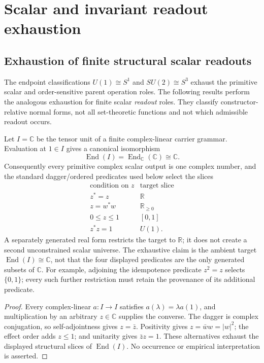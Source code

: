 \documentclass[12pt,a4paper]{article}
\begin{document}
\section{Scalar and invariant readout exhaustion}
\label{paper2a:sec:organized-readouts}

\subsection{Exhaustion of finite structural scalar readouts}
\label{p2:sec:finite-structural-readout-exhaustion}

The endpoint classifications \(U(1)\cong S^1\) and
\(SU(2)\cong S^3\) exhaust the primitive scalar and order-sensitive parent
operation roles.  The following results perform the analogous exhaustion for
finite scalar \emph{readout} roles.  They classify constructor-relative normal
forms, not all set-theoretic functions and not which admissible readout occurs.

\begin{theorem}
\label{p2:thm:scalar-target-exhaustion}
Let \(I=\mathbb C\) be the tensor unit of a finite complex-linear carrier
grammar.  Evaluation at \(1\in I\) gives a canonical isomorphism
\[
 \operatorname{End}(I)
 =\operatorname{End}_{\mathbb C}(\mathbb C)
 \cong\mathbb C.
\]
Consequently every primitive complex scalar output is one complex number, and
the standard dagger/ordered predicates used below select the slices
\[
\begin{array}{c|c}
 \text{condition on }z&\text{target slice}\\ \hline
 z^*=z&\mathbb R\\
 z=w^*w&\mathbb R_{\ge0}\\
 0\le z\le1&[0,1]\\
 z^*z=1&U(1).
\end{array}
\]
A separately generated real form restricts the target to \(\mathbb R\); it
does not create a second unconstrained scalar universe.  The exhaustive claim
is the ambient target \(\operatorname{End}(I)\cong\mathbb C\), not that the
four displayed predicates are the only generated subsets of \(\mathbb C\).
For example, adjoining the idempotence predicate \(z^2=z\) selects
\(\{0,1\}\); every such further restriction must retain the provenance of its
additional predicate.
\end{theorem}

\begin{proof}
Every complex-linear \(a:I\to I\) satisfies
\(a(\lambda)=\lambda a(1)\), and multiplication by an arbitrary
\(z\in\mathbb C\) supplies the converse.  The dagger is complex conjugation,
so self-adjointness gives \(z=\bar z\).  Positivity gives
\(z=\bar w w=|w|^2\); the effect order adds \(z\le1\); and unitarity gives
\(\bar z z=1\).  These alternatives exhaust the displayed structural slices
of \(\operatorname{End}(I)\).  No occurrence or empirical interpretation is
asserted.
\end{proof}
\end{document}
